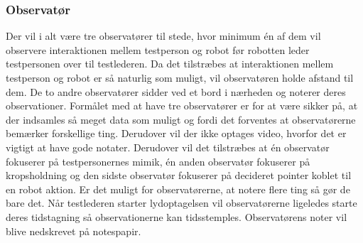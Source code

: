 \subsubsection*{Observatør}
Der vil i alt være tre observatører til stede, hvor minimum én af dem vil observere interaktionen mellem testperson og robot før robotten leder testpersonen over til testlederen. Da det tilstræbes at interaktionen mellem testperson og robot er så naturlig som muligt, vil observatøren holde afstand til dem. De to andre observatører sidder ved et bord i nærheden og noterer deres observationer. Formålet med at have tre observatører er for at være sikker på, at der indsamles så meget data som muligt og fordi det forventes at observatørerne bemærker forskellige ting. Derudover vil der ikke optages video, hvorfor det er vigtigt at have gode notater. Derudover vil det tilstræbes at én observatør fokuserer på testpersonernes mimik, én anden observatør fokuserer på kropsholdning og den sidste observatør fokuserer på decideret pointer koblet til en robot aktion. Er det muligt for observatørerne, at notere flere ting så gør de bare det. Når testlederen starter lydoptagelsen vil observatørerne ligeledes starte deres tidstagning så observationerne kan tidsstemples. Observatørens noter vil blive nedskrevet på notespapir. 


     
